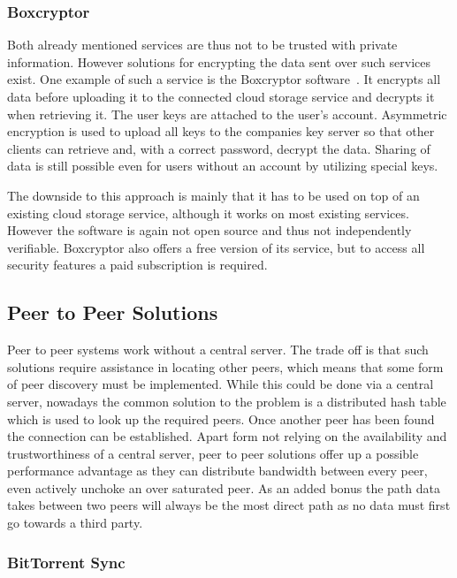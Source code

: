 \subsubsection{Boxcryptor}

Both already mentioned services are thus not to be trusted with private information.
However solutions for encrypting the data sent over such services exist.
One example of such a service is the Boxcryptor software~\cite{web:site:boxcryptor}.
It encrypts all data before uploading it to the connected cloud storage service and decrypts it when retrieving it.
The user keys are attached to the user's account.
Asymmetric encryption is used to upload all keys to the companies key server so that other clients can retrieve and, with a correct password, decrypt the data.
Sharing of data is still possible even for users without an account by utilizing special keys.

The downside to this approach is mainly that it has to be used on top of an existing cloud storage service, although it works on most existing services.
However the software is again not open source and thus not independently verifiable.
Boxcryptor also offers a free version of its service, but to access all security features a paid subscription is required.

\subsection{Peer to Peer Solutions}

Peer to peer systems work without a central server.
The trade off is that such solutions require assistance in locating other peers, which means that some form of peer discovery must be implemented.
While this could be done via a central server, nowadays the common solution to the problem is a distributed hash table which is used to look up the required peers.
Once another peer has been found the connection can be established.
Apart form not relying on the availability and trustworthiness of a central server, peer to peer solutions offer up a possible performance advantage as they can distribute bandwidth between every peer, even actively unchoke an over saturated peer.
As an added bonus the path data takes between two peers will always be the most direct path as no data must first go towards a third party.

\subsubsection{BitTorrent Sync}
\label{subs:BitTorrent Sync}


